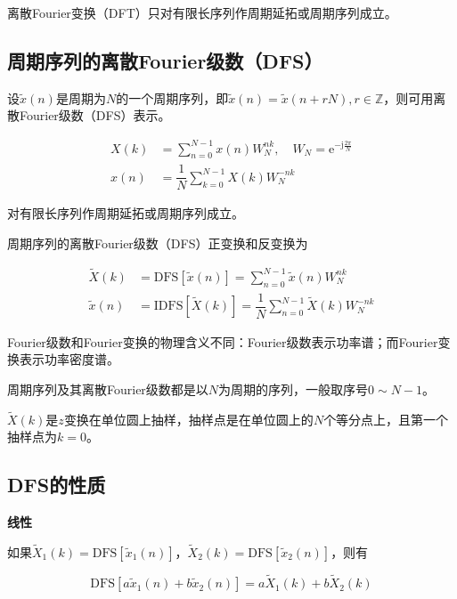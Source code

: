 \documentclass[cn, hazy, blue, normal, 12pt]{elegantnote}
\begin{document}
离散Fourier变换（DFT）只对有限长序列作周期延拓或周期序列成立。

\subsection{周期序列的离散Fourier级数（DFS）}

设$\widetilde{x}(n)$是周期为$N$的一个周期序列，即$\widetilde{x}(n)=\widetilde{x}(n+rN), r\in\mathbb{Z}$，则可用离散Fourier级数（DFS）表示。

\begin{equation}
\begin{aligned}
    X(k)&=\sum_{n=0}^{N-1}{x(n)W_{N}^{nk}}, \quad W_{N}=\text{e}^{-\text{j}\frac{2\pi}{N}} \\
    x(n)&=\dfrac{1}{N}\sum_{k=0}^{N-1}{X(k)W_{N}^{-nk}}
\end{aligned}
\end{equation}

对有限长序列作周期延拓或周期序列成立。

周期序列的离散Fourier级数（DFS）正变换和反变换为

\begin{equation}
\begin{aligned}
    \widetilde{X}(k)&=\text{DFS}[\widetilde{x}(n)]=\sum_{n=0}^{N-1}{\widetilde{x}(n)W_{N}^{nk}} \\
    \widetilde{x}(n)&=\text{IDFS}[\widetilde{X}(k)]=\dfrac{1}{N}\sum_{n=0}^{N-1}{\widetilde{X}(k)W_{N}^{-nk}}
\end{aligned}
\end{equation}

Fourier级数和Fourier变换的物理含义不同：Fourier级数表示功率谱；而Fourier变换表示功率密度谱。

周期序列及其离散Fourier级数都是以$N$为周期的序列，一般取序号$0\sim N-1$。

$\widetilde{X}(k)$是$z$变换在单位圆上抽样，抽样点是在单位圆上的$N$个等分点上，且第一个抽样点为$k=0$。

\subsection{DFS的性质}

\textbf{线性}

如果$\widetilde{X}_1(k)=\text{DFS}[\widetilde{x}_1(n)]$，$\widetilde{X}_2(k)=\text{DFS}[\widetilde{x}_2(n)]$，则有

\begin{equation}
    \text{DFS}[a\widetilde{x}_1(n)+b\widetilde{x}_2(n)]=a\widetilde{X}_1(k)+b\widetilde{X}_2(k)
\end{equation}
\end{document}
